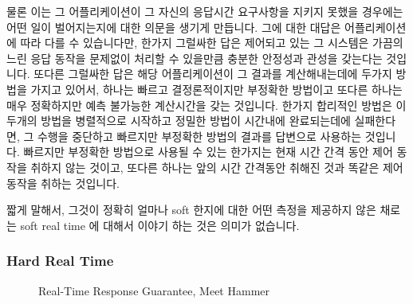 물론 이는 그 어플리케이션이 그 자신의 응답시간 요구사항을 지키지 못했을
경우에는 어떤 일이 벌어지는지에 대한 의문을 생기게 만듭니다.
그에 대한 대답은 어플리케이션에 따라 다를 수 있습니다만, 한가지 그럴싸한 답은
제어되고 있는 그 시스템은 가끔의 느린 응답 동작을 문제없이 처리할 수 있을만큼
충분한 안정성과 관성을 갖는다는 것입니다.
또다른 그럴싸한 답은 해당 어플리케이션이 그 결과를 계산해내는데에 두가지 방법을
가지고 있어서, 하나는 빠르고 결정론적이지만 부정확한 방법이고 또다른 하나는
매우 정확하지만 예측 불가능한 계산시간을 갖는 것입니다.
한가지 합리적인 방법은 이 두개의 방법을 병렬적으로 시작하고 정밀한 방법이
시간내에 완료되는데에 실패한다면, 그 수행을 중단하고 빠르지만 부정확한 방법의
결과를 답변으로 사용하는 것입니다.
빠르지만 부정확한 방법으로 사용될 수 있는 한가지는 현재 시간 간격 동안 제어
동작을 취하지 않는 것이고, 또다른 하나는 앞의 시간 간격동안 취해진 것과 똑같은
제어 동작을 취하는 것입니다.

짧게 말해서, 그것이 정확히 얼마나 soft 한지에 대한 어떤 측정을 제공하지 않은
채로는 soft real time 에 대해서 이야기 하는 것은 의미가 없습니다.

\subsubsection{Hard Real Time}
\label{sec:Hard Real Time}

\begin{figure}[bt]
\centering
{}
\caption{Real-Time Response Guarantee, Meet Hammer}
\end{figure}

